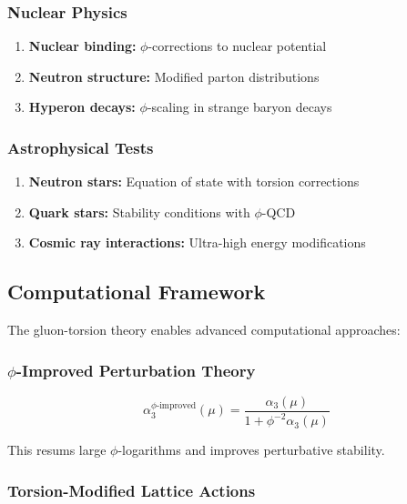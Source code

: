 \subsubsection{Nuclear Physics}

\begin{enumerate}
\item \textbf{Nuclear binding:} $\phi$-corrections to nuclear potential
\item \textbf{Neutron structure:} Modified parton distributions
\item \textbf{Hyperon decays:} $\phi$-scaling in strange baryon decays
\end{enumerate}

\subsubsection{Astrophysical Tests}

\begin{enumerate}
\item \textbf{Neutron stars:} Equation of state with torsion corrections
\item \textbf{Quark stars:} Stability conditions with $\phi$-QCD
\item \textbf{Cosmic ray interactions:} Ultra-high energy modifications
\end{enumerate}

\subsection{Computational Framework}

The gluon-torsion theory enables advanced computational approaches:

\subsubsection{$\phi$-Improved Perturbation Theory}

\begin{equation}
\alpha_3^{\text{$\phi$-improved}}(\mu) = \frac{\alpha_3(\mu)}{1 + \phi^{-2} \alpha_3(\mu)}
\end{equation}

This resums large $\phi$-logarithms and improves perturbative stability.

\subsubsection{Torsion-Modified Lattice Actions}

